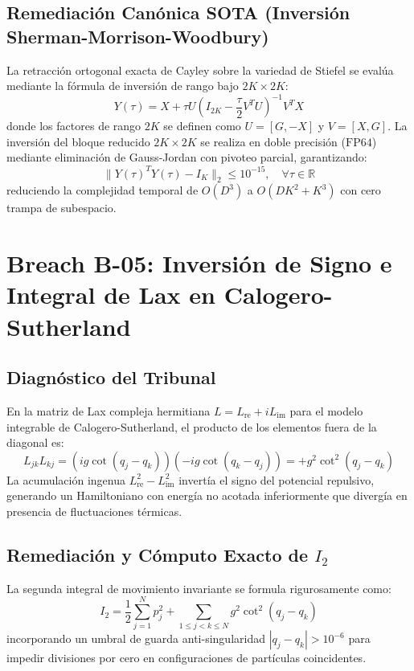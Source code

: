 \subsection{Remediación Canónica SOTA (Inversión Sherman-Morrison-Woodbury)}
La retracción ortogonal exacta de Cayley sobre la variedad de Stiefel se evalúa mediante la fórmula de inversión de rango bajo $2K \times 2K$:
\begin{equation}
Y(\tau) = X + \tau U \left( I_{2K} - \frac{\tau}{2} V^T U \right)^{-1} V^T X
\end{equation}
donde los factores de rango $2K$ se definen como $U = [G, -X]$ y $V = [X, G]$. La inversión del bloque reducido $2K \times 2K$ se realiza en doble precisión ($\text{FP64}$) mediante eliminación de Gauss-Jordan con pivoteo parcial, garantizando:
\begin{equation}
\|Y(\tau)^T Y(\tau) - I_K\|_2 \le 10^{-15}, \quad \forall \tau \in \mathbb{R}
\end{equation}
reduciendo la complejidad temporal de $O(D^3)$ a $O(D K^2 + K^3)$ con cero trampa de subespacio.

\section{Breach B-05: Inversión de Signo e Integral de Lax en Calogero-Sutherland}
\subsection{Diagnóstico del Tribunal}
En la matriz de Lax compleja hermitiana $L = L_{\text{re}} + i L_{\text{im}}$ para el modelo integrable de Calogero-Sutherland, el producto de los elementos fuera de la diagonal es:
\begin{equation}
L_{jk} L_{kj} = (i g \cot(q_j - q_k)) (-i g \cot(q_k - q_j)) = + g^2 \cot^2(q_j - q_k)
\end{equation}
La acumulación ingenua $L_{\text{re}}^2 - L_{\text{im}}^2$ invertía el signo del potencial repulsivo, generando un Hamiltoniano con energía no acotada inferiormente que divergía en presencia de fluctuaciones térmicas.

\subsection{Remediación y Cómputo Exacto de $I_2$}
La segunda integral de movimiento invariante se formula rigurosamente como:
\begin{equation}
I_2 = \frac{1}{2} \sum_{j=1}^N p_j^2 + \sum_{1 \le j < k \le N} g^2 \cot^2(q_j - q_k)
\end{equation}
incorporando un umbral de guarda anti-singularidad $|q_j - q_k| > 10^{-6}$ para impedir divisiones por cero en configuraciones de partículas coincidentes.

